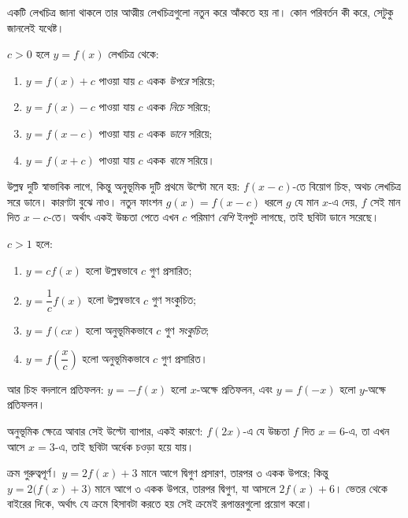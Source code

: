 \documentclass[11pt]{article}
\begin{document}
একটি লেখচিত্র জানা থাকলে তার আত্মীয় লেখচিত্রগুলো নতুন করে আঁকতে হয় না। কোন
পরিবর্তন কী করে, সেটুকু জানলেই যথেষ্ট।

\begin{idea}[স্থানান্তর]
$c > 0$ হলে $y = f(x)$ লেখচিত্র থেকে:
\begin{enumerate}
  \item $y = f(x) + c$ পাওয়া যায় $c$ একক \emph{উপরে} সরিয়ে;
  \item $y = f(x) - c$ পাওয়া যায় $c$ একক \emph{নিচে} সরিয়ে;
  \item $y = f(x - c)$ পাওয়া যায় $c$ একক \emph{ডানে} সরিয়ে;
  \item $y = f(x + c)$ পাওয়া যায় $c$ একক \emph{বামে} সরিয়ে।
\end{enumerate}
\end{idea}

উল্লম্ব দুটি স্বাভাবিক লাগে, কিন্তু অনুভূমিক দুটি প্রথমে উল্টো মনে হয়:
$f(x-c)$-তে বিয়োগ চিহ্ন, অথচ লেখচিত্র সরে ডানে। কারণটা বুঝে নাও। নতুন ফাংশন
$g(x) = f(x-c)$ ধরলে $g$ যে মান $x$-এ দেয়, $f$ সেই মান দিত $x - c$-তে। অর্থাৎ
একই উচ্চতা পেতে এখন $c$ পরিমাণ \emph{বেশি} ইনপুট লাগছে, তাই ছবিটা ডানে সরেছে।

\begin{idea}[সংকোচন, প্রসারণ ও প্রতিফলন]
$c > 1$ হলে:
\begin{enumerate}
  \item $y = c f(x)$ হলো উল্লম্বভাবে $c$ গুণ প্রসারিত;
  \item $y = \dfrac{1}{c} f(x)$ হলো উল্লম্বভাবে $c$ গুণ সংকুচিত;
  \item $y = f(cx)$ হলো অনুভূমিকভাবে $c$ গুণ \emph{সংকুচিত};
  \item $y = f\!\left( \dfrac{x}{c} \right)$ হলো অনুভূমিকভাবে $c$ গুণ প্রসারিত।
\end{enumerate}
আর চিহ্ন বদলালে প্রতিফলন: $y = -f(x)$ হলো $x$-অক্ষে প্রতিফলন, এবং
$y = f(-x)$ হলো $y$-অক্ষে প্রতিফলন।
\end{idea}

অনুভূমিক ক্ষেত্রে আবার সেই উল্টো ব্যাপার, একই কারণে: $f(2x)$-এ যে উচ্চতা $f$
দিত $x = 6$-এ, তা এখন আসে $x = 3$-এ, তাই ছবিটা অর্ধেক চওড়া হয়ে যায়।

\begin{remark}
ক্রম গুরুত্বপূর্ণ। $y = 2f(x) + 3$ মানে আগে দ্বিগুণ প্রসারণ, তারপর ৩ একক উপরে;
কিন্তু $y = 2\bigl( f(x) + 3 \bigr)$ মানে আগে ৩ একক উপরে, তারপর দ্বিগুণ, যা
আসলে $2f(x) + 6$। ভেতর থেকে বাইরের দিকে, অর্থাৎ যে ক্রমে হিসাবটা করতে হয় সেই
ক্রমেই রূপান্তরগুলো প্রয়োগ করো।
\end{remark}
\end{document}
